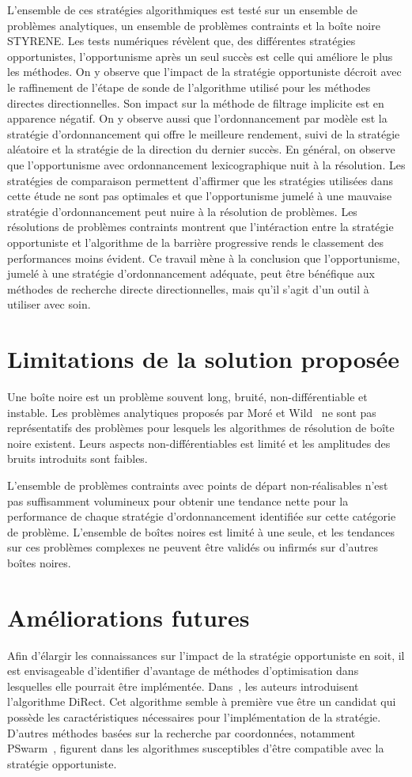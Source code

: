 L'ensemble de ces stratégies algorithmiques est testé sur un ensemble de problèmes analytiques, un ensemble de problèmes contraints et la boîte noire STYRENE. Les tests numériques révèlent que, des différentes stratégies opportunistes, l'opportunisme après un seul succès est celle qui améliore le plus les méthodes. On y observe que l'impact de la stratégie opportuniste décroit avec le raffinement de l'étape de sonde de l'algorithme utilisé pour les méthodes directes directionnelles. Son impact sur la méthode de filtrage implicite est en apparence négatif. On y observe aussi que l'ordonnancement par modèle est la stratégie d'ordonnancement qui offre le meilleure rendement, suivi de la stratégie aléatoire et la stratégie de la direction du dernier succès. En général, on observe que l'opportunisme avec ordonnancement lexicographique nuit à la résolution. Les stratégies de comparaison permettent d'affirmer que les stratégies utilisées dans cette étude ne sont pas optimales et que l'opportunisme jumelé à une mauvaise stratégie d'ordonnancement peut nuire à la résolution de problèmes. Les résolutions de problèmes contraints montrent que l'intéraction entre la stratégie opportuniste et l'algorithme de la barrière progressive rends le classement des performances moins évident. Ce travail mène à la conclusion que l'opportunisme, jumelé à une stratégie d'ordonnancement adéquate, peut être bénéfique aux méthodes de recherche directe directionnelles, mais qu'il s'agit d'un outil à utiliser avec soin.
\section{Limitations de la solution proposée}\label{sec:Limitations}
Une boîte noire est un problème souvent long, bruité, non-différentiable et instable. Les problèmes analytiques proposés par Moré et Wild~\cite{MoWi2009} ne sont pas représentatifs des problèmes pour lesquels les algorithmes de résolution de boîte noire existent. Leurs aspects non-différentiables est limité et les amplitudes des bruits introduits sont faibles.

L'ensemble de problèmes contraints avec points de départ non-réalisables n'est pas suffisamment volumineux pour obtenir une tendance nette pour la performance de chaque stratégie d'ordonnancement identifiée sur cette catégorie de problème. L'ensemble de boîtes noires est limité à une seule, et les tendances sur ces problèmes complexes ne peuvent être validés ou infirmés sur d'autres boîtes noires.
\section{Améliorations futures}
Afin d'élargir les connaissances sur l'impact de la stratégie opportuniste en soit, il est envisageable d'identifier d'avantage de méthodes d'optimisation dans lesquelles elle pourrait être implémentée. Dans~\cite{JoPeSt93a}, les auteurs introduisent l'algorithme \textsf{DiRect}. Cet algorithme semble à première vue être un candidat qui possède les caractéristiques nécessaires pour l'implémentation de la stratégie. D'autres méthodes basées sur la recherche par coordonnées, notamment \textsf{PSwarm}~\cite{VaVi07}, figurent dans les algorithmes susceptibles d'être compatible avec la stratégie opportuniste.

